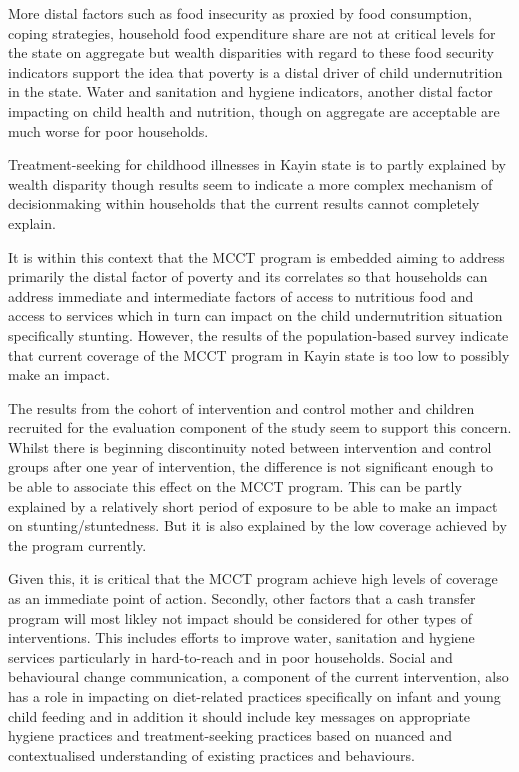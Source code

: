 \documentclass[12pt,a4paper]{article}
\begin{document}
More distal factors such as food insecurity as proxied by food consumption, coping strategies, household food expenditure share are not at critical levels for the state on aggregate but wealth disparities with regard to these food security indicators support the idea that poverty is a distal driver of child undernutrition in the state. Water and sanitation and hygiene indicators, another distal factor impacting on child health and nutrition, though on aggregate are acceptable are much worse for poor households.

Treatment-seeking for childhood illnesses in Kayin state is to partly explained by wealth disparity though results seem to indicate a more complex mechanism of decisionmaking within households that the current results cannot completely explain.

It is within this context that the MCCT program is embedded aiming to address primarily the distal factor of poverty and its correlates so that households can address immediate and intermediate factors of access to nutritious food and access to services which in turn can impact on the child undernutrition situation specifically stunting. However, the results of the population-based survey indicate that current coverage of the MCCT program in Kayin state is too low to possibly make an impact.

The results from the cohort of intervention and control mother and children recruited for the evaluation component of the study seem to support this concern. Whilst there is beginning discontinuity noted between intervention and control groups after one year of intervention, the difference is not significant enough to be able to associate this effect on the MCCT program. This can be partly explained by a relatively short period of exposure to be able to make an impact on stunting/stuntedness. But it is also explained by the low coverage achieved by the program currently.

Given this, it is critical that the MCCT program achieve high levels of coverage as an immediate point of action. Secondly, other factors that a cash transfer program will most likley not impact should be considered for other types of interventions. This includes efforts to improve water, sanitation and hygiene services particularly in hard-to-reach and in poor households. Social and behavioural change communication, a component of the current intervention, also has a role in impacting on diet-related practices specifically on infant and young child feeding and in addition it should include key messages on appropriate hygiene practices and treatment-seeking practices based on nuanced and contextualised understanding of existing practices and behaviours.
\end{document}
